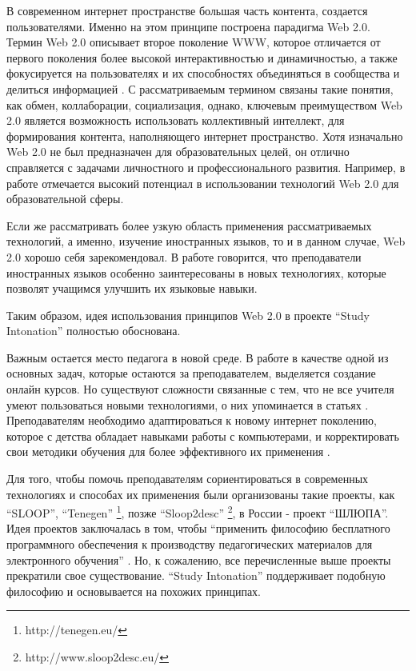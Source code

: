 \documentclass[%
  a5paper,
  subf,
  href,
  master,
  dotsinheaders 
]{csse-fcs}
\begin{document}
В современном интернет пространстве большая часть контента, создается пользователями. Именно на этом принципе построена парадигма Web 2.0. Термин Web 2.0 описывает второе поколение WWW, которое отличается от первого поколения более высокой интерактивностью и динамичностью, а также фокусируется на пользователях и их способностях объединяться в сообщества и делиться информацией \cite{techopedia}. С рассматриваемым термином связаны такие понятия, как обмен, коллаборации, социализация, однако, ключевым преимуществом Web 2.0 является возможность использовать коллективный интеллект, для формирования контента, наполняющего интернет пространство. Хотя изначально Web 2.0 не был предназначен для образовательных целей, он отлично справляется с задачами личностного и профессионального развития. Например, в работе \cite{franklin2007web} отмечается высокий потенциал в использовании технологий Web 2.0 для образовательной сферы.

Если же рассматривать более узкую область применения рассматриваемых технологий, а именно, изучение иностранных языков, то и в данном случае, Web 2.0 хорошо себя зарекомендовал. В работе \cite{bacsal2014using} говорится, что преподаватели иностранных языков особенно заинтересованы в новых технологиях, которые позволят учащимся улучшить их языковые навыки.

Таким образом, идея использования принципов Web 2.0 в проекте “Study Intonation” полностью обоснована.

Важным остается место педагога в новой среде. В работе \cite{yengin2010roles} в качестве одной из основных задач, которые остаются за преподавателем, выделяется создание онлайн курсов. Но существуют сложности связанные с тем, что не все учителя умеют пользоваться новыми технологиями, о них упоминается в статьях \cite{huang2008web, pushpanathanrole}. Преподавателям необходимо адаптироваться к новому интернет поколению, которое с детства обладает навыками работы с компьютерами, и корректировать свои методики обучения для более эффективного их применения \cite{tenegen}.

Для того, чтобы помочь преподавателям сориентироваться в современных технологиях и способах их применения были организованы такие проекты, как “SLOOP”, “Tenegen” \footnote{http://tenegen.eu/}, позже “Sloop2desc” \footnote{http://www.sloop2desc.eu/}, в России - проект “ШЛЮПА”. Идея проектов заключалась в том, чтобы “применить философию бесплатного программного обеспечения к производству педагогических материалов для электронного обучения” \cite{shlupa}. Но, к сожалению, все перечисленные выше проекты прекратили свое существование. “Study Intonation” поддерживает подобную философию и основывается на похожих принципах.
\end{document}
